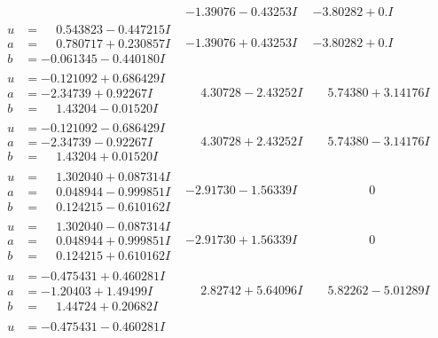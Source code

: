 \documentclass[1p]{elsarticle_modified}
\theoremstyle{definition}
\begin{document}
$$\begin{array}{c|c|c}
 & -1.39076 - 0.43253 I & -3.80282 + 0. I\phantom{ +0.000000I} \\ \hline\begin{aligned}
u &= \phantom{-}0.543823 - 0.447215 I \\
a &= \phantom{-}0.780717 + 0.230857 I \\
b &= -0.061345 - 0.440180 I\end{aligned}
 & -1.39076 + 0.43253 I & -3.80282 + 0. I\phantom{ +0.000000I} \\ \hline\begin{aligned}
u &= -0.121092 + 0.686429 I \\
a &= -2.34739 + 0.92267 I \\
b &= \phantom{-}1.43204 - 0.01520 I\end{aligned}
 & \phantom{-}4.30728 - 2.43252 I & \phantom{-}5.74380 + 3.14176 I \\ \hline\begin{aligned}
u &= -0.121092 - 0.686429 I \\
a &= -2.34739 - 0.92267 I \\
b &= \phantom{-}1.43204 + 0.01520 I\end{aligned}
 & \phantom{-}4.30728 + 2.43252 I & \phantom{-}5.74380 - 3.14176 I \\ \hline\begin{aligned}
u &= \phantom{-}1.302040 + 0.087314 I \\
a &= \phantom{-}0.048944 - 0.999851 I \\
b &= \phantom{-}0.124215 - 0.610162 I\end{aligned}
 & -2.91730 - 1.56339 I & \phantom{-0.000000 } 0 \\ \hline\begin{aligned}
u &= \phantom{-}1.302040 - 0.087314 I \\
a &= \phantom{-}0.048944 + 0.999851 I \\
b &= \phantom{-}0.124215 + 0.610162 I\end{aligned}
 & -2.91730 + 1.56339 I & \phantom{-0.000000 } 0 \\ \hline\begin{aligned}
u &= -0.475431 + 0.460281 I \\
a &= -1.20403 + 1.49499 I \\
b &= \phantom{-}1.44724 + 0.20682 I\end{aligned}
 & \phantom{-}2.82742 + 5.64096 I & \phantom{-}5.82262 - 5.01289 I \\ \hline\begin{aligned}
u &= -0.475431 - 0.460281 I \\

\end{aligned}
\end{array}$$
\end{document}
